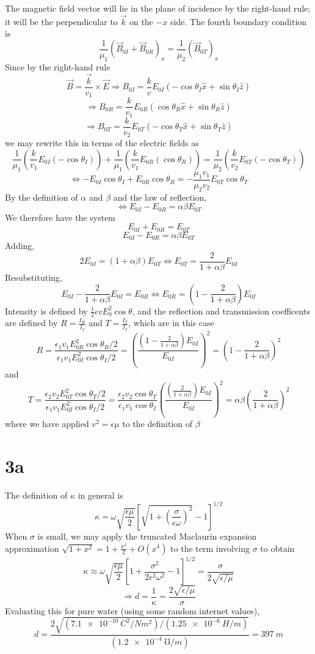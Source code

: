 \documentclass{article}
\begin{document}
The magnetic field vector will lie in the plane of incidence by the right-hand rule; it will be the perpendicular to $\vec{k}$ on the $-x$ side. The fourth boundary condition is
\[\frac{1}{\mu_{1}}\left( \vec{B}_{0I}+\vec{B}_{0R}\right)_{x}=\frac{1}{\mu_{2}}\left( \vec{B}_{0T} \right)_{x}\]
Since by the right-hand rule
\[\vec{B}=\frac{\vec{k}}{v_{1}}\times \vec{E}\Rightarrow B_{0I}=\frac{k}{c}E_{0I}(-\cos\theta_{I}\hat{x}+\sin\theta_{I}\hat{z})\]
\[\Rightarrow B_{0R}=\frac{k}{v_{1}}E_{0R}(\cos\theta_{R}\hat{x}+\sin\theta_{R}\hat{z})\]
\[\Rightarrow B_{0T}=\frac{k}{v_{2}}E_{0T}(-\cos\theta_{T}\hat{x}+\sin\theta_{T}\hat{z})\]
 we may rewrite this in terms of the electric fields as
 \[\frac{1}{\mu_{1}}\left( \frac{k}{v_{1}}E_{0I}(-\cos\theta_{I}) \right)+\frac{1}{\mu_{1}}\left( \frac{k}{v_{1}}E_{0R} (\cos\theta_{R})\right)=\frac{1}{\mu_{2}}\left( \frac{k}{v_{2}}E_{0T}(-\cos\theta_{T}) \right)\]
 \[\Leftrightarrow -E_{0I}\cos\theta_{I}+E_{0R}\cos\theta_{R}=-\frac{\mu_{1}v_{1}}{\mu_{2}v_{2}}E_{0T}\cos\theta_{T} \]
By the definition of $\alpha$ and $\beta$ and the law of reflection,
\[\Leftrightarrow E_{0I}-E_{0R}=\alpha\beta E_{0T}\]
We therefore have the system
\[E_{0I}+E_{0R}=E_{0T}\]
\[E_{0I}-E_{0R}=\alpha\beta E_{0T}\]
Adding,
\[2E_{0I}=(1+\alpha\beta)E_{0T}\Leftrightarrow E_{0T}=\frac{2}{1+\alpha\beta}E_{0I}\]
Resubstituting,
\[E_{0I}-\frac{2}{1+\alpha\beta}E_{0I}=E_{0R}\Leftrightarrow E_{0R}=\left( 1-\frac{2}{1+\alpha\beta} \right)E_{0I}\]
Intensity is defined by $\frac{1}{2}\epsilon vE_{0}^{2}\cos\theta$, and the reflection and transmission coefficents are defined by $R=\frac{I_{R}}{I_{I}}$ and $T=\frac{I_{T}}{I_{I}}$, which are in this case
\[R=\frac{\epsilon_{1}v_{1}E_{0R}^{2}\cos\theta_{R}/2}{\epsilon_{1}v_{1}E_{0I}^{2}\cos\theta_{I}/2}=\left( \frac{\left( 1-\frac{2}{1+\alpha\beta}\right)E_{0I}}{E_{0I}} \right)^{2}=\left( 1-\frac{2}{1+\alpha\beta}\right)^{2}\]
and
\[T=\frac{\epsilon_{2}v_{2}E_{0T}^{2}\cos\theta_{T}/2}{\epsilon_{1}v_{1}E_{0I}^{2}\cos\theta_{I}/2}=\frac{\epsilon_{2}v_{2}\cos\theta_{T}}{\epsilon_{1}v_{1}\cos\theta_{I}}\left( \frac{\left( \frac{2}{1+\alpha\beta} \right)E_{0I}}{E_{0I}} \right)^{2}=\alpha\beta\left( \frac{2}{1+\alpha\beta} \right)^{2}\]
where we have applied $v^{2}=\epsilon\mu$ to the definition of $\beta$

\section*{3a}
The definition of $\kappa$ in general is
\[\kappa=\omega\sqrt{\frac{\epsilon\mu}{2}}\left[ \sqrt{1+\left( \frac{\sigma}{\epsilon\omega} \right)^{2}}-1 \right]^{1/2}\]
When $\sigma$ is small, we may apply the truncated Maclaurin expansion approximation $\sqrt{1+x^{2}}=1+\frac{x^{2}}{2}+O(x^{4})$ to the term involving $\sigma$ to obtain
\[\kappa\approx\omega\sqrt{\frac{\epsilon\mu}{2}}\left[ 1+\frac{\sigma^{2}}{2\epsilon^{2}\omega^{2}} -1\right]^{1/2}=\frac{\sigma}{2\sqrt{\epsilon/\mu}}\]
\[\Rightarrow d=\frac{1}{\kappa}=\frac{2\sqrt{\epsilon/\mu}}{\sigma}\]
Evaluating this for pure water (using some random internet values),
\[d=\frac{2\sqrt{(\SI{7.1e-10}{C^{2}/Nm^{2}})/(\SI{1.25e-6}{H/m})}}{(\SI{1.2e-4}{\mho/m})}=\SI{397}{m}\]
\end{document}

